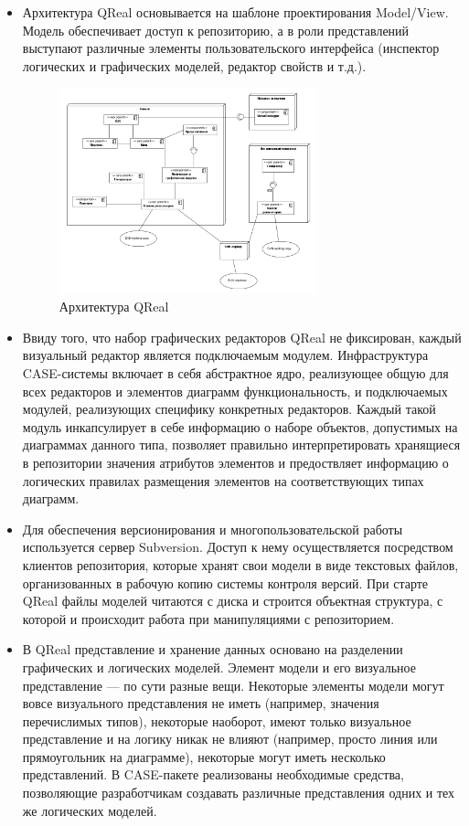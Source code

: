 \documentclass[a4paper]{article}
\begin{document}
\begin{itemize}
  \item Архитектура QReal основывается на шаблоне проектирования Model/View. Модель обеспечивает доступ к репозиторию, а в роли представлений выступают различные элементы пользовательского интерфейса (инспектор логических и графических моделей, редактор свойств и т.д.). 
\begin{figure} [ht]
  \begin{center}
    \includegraphics[width=0.7\textwidth]{01-architecture.png}
    \caption{Архитектура QReal}
    \label{qRealArchitecture}
  \end{center}
\end{figure}
  \item Ввиду того, что набор графических редакторов QReal не фиксирован, каждый визуальный редактор является подключаемым модулем. Инфраструктура CASE-системы включает в себя абстрактное ядро, реализующее общую для всех редакторов и элементов диаграмм функциональность, и подключаемых модулей, реализующих специфику конкретных редакторов. Каждый такой модуль инкапсулирует в себе информацию о наборе объектов, допустимых на диаграммах данного типа, позволяет правильно интерпретировать хранящиеся в репозитории значения атрибутов элементов и предоствляет информацию о логических правилах размещения элементов на соответствующих типах диаграмм.
  \item Для обеспечения версионирования и многопользовательской работы используется сервер Subversion. Доступ к нему осуществляется посредством клиентов репозитория, которые хранят свои модели в виде текстовых файлов, организованных в рабочую копию системы контроля версий. При старте QReal файлы моделей читаются с диска и строится объектная структура, с которой и происходит работа при манипуляциями с репозиторием. 
  \item В QReal представление и хранение данных основано на разделении графических и логических моделей. Элемент модели и его визуальное представление --- по сути разные вещи. Некоторые элементы модели могут вовсе визуального представления не иметь (например, значения перечислимых типов), некоторые наоборот, имеют только визуальное представление и на логику никак не влияют (например, просто линия или прямоугольник на диаграмме), некоторые могут иметь несколько представлений. В CASE-пакете реализованы необходимые средства, позволяющие разработчикам создавать различные представления одних и тех же логических моделей.
\end{itemize}
\end{document}
